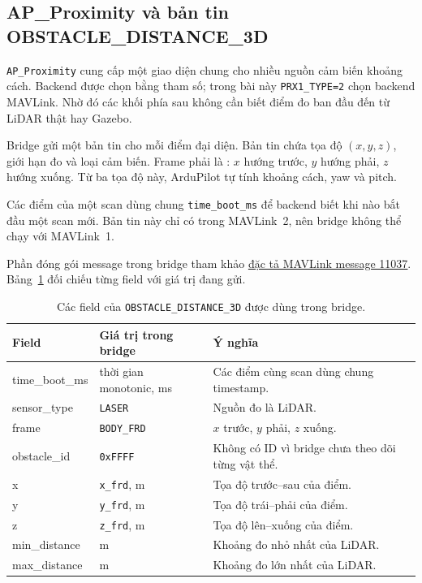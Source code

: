 \documentclass[11pt,a4paper]{article}
\begin{document}
\subsection{AP\_Proximity và bản tin OBSTACLE\_DISTANCE\_3D}

\texttt{AP\_Proximity} cung cấp một giao diện chung cho nhiều nguồn cảm biến khoảng cách. Backend được chọn bằng tham số; trong bài này \texttt{PRX1\_TYPE=2} chọn backend MAVLink. Nhờ đó các khối phía sau không cần biết điểm đo ban đầu đến từ LiDAR thật hay Gazebo.

Bridge gửi một bản tin  cho mỗi điểm đại diện. Bản tin chứa tọa độ $(x,y,z)$, giới hạn đo và loại cảm biến. Frame phải là : $x$ hướng trước, $y$ hướng phải, $z$ hướng xuống. Từ ba tọa độ này, ArduPilot tự tính khoảng cách, yaw và pitch.

Các điểm của một scan dùng chung \texttt{time\_boot\_ms} để backend biết khi nào bắt đầu một scan mới. Bản tin này chỉ có trong MAVLink~2, nên bridge không thể chạy với MAVLink~1.

Phần đóng gói message trong bridge tham khảo \href{https://mavlink.io/en/messages/ardupilotmega.html#OBSTACLE_DISTANCE_3D}{\textcolor{demogreen}{\underline{đặc tả MAVLink message 11037}}}. Bảng~\ref{tab:obstacle-fields} đối chiếu từng field với giá trị đang gửi.

\begin{table}[H]
\centering
\footnotesize
\renewcommand{\arraystretch}{1.08}
\begin{tabularx}{\textwidth}{@{}>{\ttfamily}p{31mm}>{\RaggedRight\arraybackslash}p{43mm}>{\RaggedRight\arraybackslash}X@{}}
\toprule
\normalfont Field & Giá trị trong bridge & Ý nghĩa \\
\midrule
time\_boot\_ms & \normalfont thời gian monotonic, ms & Các điểm cùng scan dùng chung timestamp. \\
sensor\_type & \normalfont \texttt{LASER} & Nguồn đo là LiDAR. \\
frame & \normalfont \texttt{BODY\_FRD} & $x$ trước, $y$ phải, $z$ xuống. \\
obstacle\_id & \normalfont \texttt{0xFFFF} & Không có ID vì bridge chưa theo dõi từng vật thể. \\
x & \normalfont \texttt{x\_frd}, m & Tọa độ trước--sau của điểm. \\
y & \normalfont \texttt{y\_frd}, m & Tọa độ trái--phải của điểm. \\
z & \normalfont \texttt{z\_frd}, m & Tọa độ lên--xuống của điểm. \\
min\_distance & \normalfont 0.15 m & Khoảng đo nhỏ nhất của LiDAR. \\
max\_distance & \normalfont 30 m & Khoảng đo lớn nhất của LiDAR. \\
\bottomrule
\end{tabularx}
\caption{Các field của \texttt{OBSTACLE\_DISTANCE\_3D} được dùng trong bridge.}
\label{tab:obstacle-fields}
\end{table}
\end{document}
